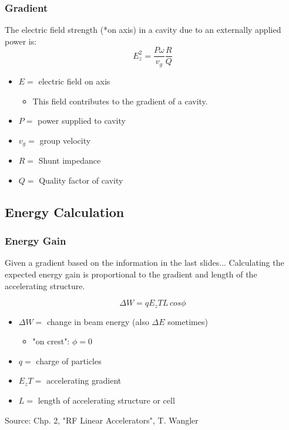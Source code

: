 \documentclass[professionalfonts,t]{beamer}
\begin{document}
\begin{frame}
	\frametitle{Gradient}
	The electric field strength (*on axis) in a cavity 
	due to an externally applied power is:
	\begin{equation}
		E^2_z = \frac{P\omega}{v_g} \frac{R}{Q}
	\end{equation}
	\begin{itemize}
		\item $E =$ electric field on axis
		\begin{itemize}
			\item This field contributes to the gradient of a cavity.
		\end{itemize}
		\item $P =$ power supplied to cavity
		\item $v_g =$ group velocity
		\item $R =$ Shunt impedance 
		\item $Q =$ Quality factor of cavity
	\end{itemize}

\end{frame}

\subsection{Energy Calculation}
\begin{frame}
\frametitle{Energy Gain}
Given a gradient based on the information in the last slides...
Calculating the expected energy gain is proportional to the gradient and length of the accelerating structure. 

\begin{equation}
	\Delta W = qE_zTL\, cos\phi
\end{equation}

\begin{itemize}
	\item $\Delta W = $ change in beam energy (also $\Delta E$ sometimes)
	\begin{itemize}
		\item "on crest": $ \phi=0$
	\end{itemize}
	\item $q =$ charge of particles
	\item $E_zT = $ accelerating gradient
	\item $L = $ length of accelerating structure or cell 
\end{itemize}

\vspace{0.25em}
Source: Chp. 2, "RF Linear Accelerators", T. Wangler
\end{frame}
\end{document}
